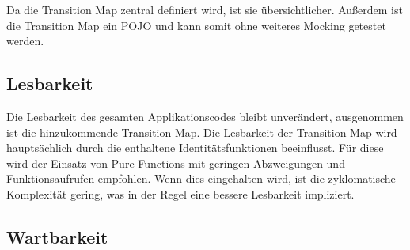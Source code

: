 Da die Transition Map zentral definiert wird, ist sie übersichtlicher. Außerdem ist die Transition Map ein POJO und kann somit ohne weiteres Mocking getestet werden.

\subsection{Lesbarkeit}
Die Lesbarkeit des gesamten Applikationscodes bleibt unverändert, ausgenommen ist die hinzukommende Transition Map. Die Lesbarkeit der Transition Map wird hauptsächlich durch die enthaltene Identitätsfunktionen beeinflusst. Für diese wird der Einsatz von Pure Functions mit geringen Abzweigungen und Funktionsaufrufen empfohlen. Wenn dies eingehalten wird, ist die zyklomatische Komplexität gering, was in der Regel eine bessere Lesbarkeit impliziert.

\subsection{Wartbarkeit}


